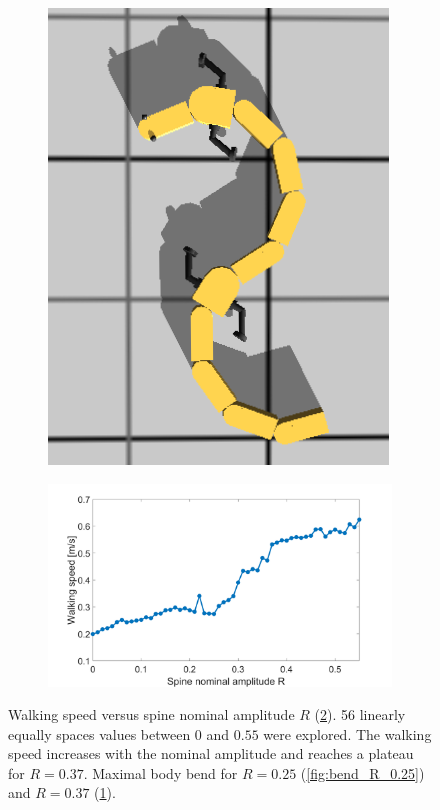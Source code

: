 \documentclass[a4paper]{scrartcl}
\begin{document}
{\begin{figure}
\begin{subfigure}[b]{0.45\linewidth}
  \centering
  \includegraphics[width=\textwidth]{Figures/figure3Ac.png}
  \caption{\label{fig:bend_R_0.37}}
 \end{subfigure}
 \begin{subfigure}[b]{\linewidth}
  \centering
  \includegraphics[width=\linewidth]{Figures/figure3Aa.png}
  \caption{\label{fig:speed_R}}
 \end{subfigure}
 \caption{\label{fig:walking_speed_R} Walking speed versus spine nominal amplitude $R$ (\ref{fig:speed_R}). 56 linearly equally spaces values between $0$ and $0.55$ were explored. The walking speed increases with the nominal amplitude and reaches a plateau for $R=0.37$. Maximal body bend for $R=0.25$ (\ref{fig:bend_R_0.25}) and $R=0.37$ (\ref{fig:bend_R_0.37}).}
\end{figure}

}
\end{document}
